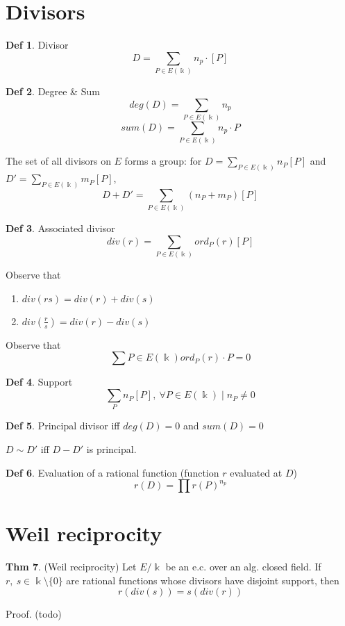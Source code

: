 \documentclass{article}
\theoremstyle{definition}
\newtheorem{definition}{Def}[section]
\newtheorem{theorem}[definition]{Thm}
\begin{document}
\section{Divisors}

\begin{definition}{Divisor}
  $$D= \sum_{P \in E(\Bbbk)} n_p \cdot [P]$$
\end{definition}

\begin{definition}{Degree \& Sum}
  $$deg(D)= \sum_{P \in E(\Bbbk)} n_p$$
  $$sum(D)= \sum_{P \in E(\Bbbk)} n_p \cdot P$$
\end{definition}


The set of all divisors on $E$ forms a group: for $D = \sum_{P\in E(\Bbbk)} n_P[P]$ and $D' = \sum_{P\in E(\Bbbk)} m_P[P]$,
$$D+D' = \sum_{P\in E(\Bbbk)} (n_P + m_P)[P]$$

\begin{definition}{Associated divisor}
  $$div(r) = \sum_{P \in E(\Bbbk)} ord_P(r)[P]$$
\end{definition}

Observe that
\begin{enumerate}
  \item[] $div(rs) = div(r)+div(s)$
  \item[] $div(\frac{r}{s}) = div(r)-div(s)$
\end{enumerate}

Observe that
$$\sum{P \in E(\Bbbk)} ord_P(r) \cdot P = 0$$

\begin{definition}{Support}
  $$\sum_P n_P[P], ~\forall P \in E(\Bbbk) \mid n_P \neq 0$$
\end{definition}

\begin{definition}{Principal divisor}
  iff $deg(D)=0$ and $sum(D)=0$
\end{definition}
$D \sim D'$ iff $D - D'$ is principal.


\begin{definition}{Evaluation of a rational function} (function $r$ evaluated at $D$)
  $$r(D)= \prod r(P)^{n_p}$$
\end{definition}

\section{Weil reciprocity}
\begin{theorem}{(Weil reciprocity)}
  Let $E/ \Bbbk$ be an e.c. over an alg. closed field. If $r,~s \in \Bbbk\setminus \{0\}$ are rational functions whose divisors have disjoint support, then
$$r(div(s)) = s(div(r))$$
\end{theorem}
Proof. (todo)
\end{document}
